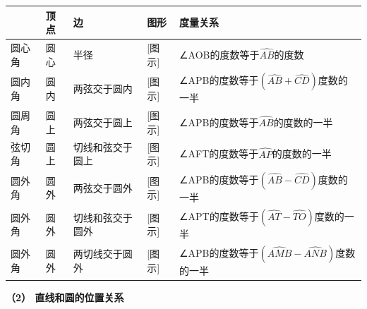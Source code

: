 {\def\LTcaptype{none} %
\begin{longtable}[]{@{}
  >{\raggedright\arraybackslash}p{}
  >{\raggedright\arraybackslash}p{}
  >{\raggedright\arraybackslash}p{}
  >{\raggedright\arraybackslash}p{}
  >{\raggedright\arraybackslash}p{}@{}}
\toprule\noalign{}
\begin{minipage}[b]{\linewidth}\raggedright
\end{minipage} & \begin{minipage}[b]{\linewidth}\raggedright
顶点
\end{minipage} & \begin{minipage}[b]{\linewidth}\raggedright
边
\end{minipage} & \begin{minipage}[b]{\linewidth}\raggedright
图形
\end{minipage} & \begin{minipage}[b]{\linewidth}\raggedright
度量关系
\end{minipage} \\
\midrule\noalign{}
\endhead
\bottomrule\noalign{}
\endlastfoot
圆心角 & 圆心 & 半径 & {[}图示{]} &
∠AOB的度数等于\(\widehat{AB}\)的度数 \\
圆内角 & 圆内 & 两弦交于圆内 & {[}图示{]} &
∠APB的度数等于\((\widehat{AB}+\widehat{CD})\)度数的一半 \\
圆周角 & 圆上 & 两弦交于圆上 & {[}图示{]} &
∠APB的度数等于\(\widehat{AB}\)的度数的一半 \\
弦切角 & 圆上 & 切线和弦交于圆上 & {[}图示{]} &
∠AFT的度数等于\(\widehat{AP}\)的度数的一半 \\
圆外角 & 圆外 & 两弦交于圆外 & {[}图示{]} &
∠APB的度数等于\((\widehat{AB}-\widehat{CD})\)度数的一半 \\
圆外角 & 圆外 & 切线和弦交于圆外 & {[}图示{]} &
∠APT的度数等于\((\widehat{AT}-\widehat{TO})\)度数的一半 \\
圆外角 & 圆外 & 两切线交于圆外 & {[}图示{]} &
∠APB的度数等于\((\widehat{AMB}-\widehat{ANB})\)度数的一半 \\
\end{longtable}
}

\textbf{（2） 直线和圆的位置关系}

